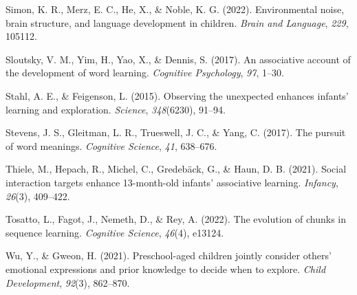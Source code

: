 \documentclass[10pt, letterpaper]{article}
\newenvironment{CSLReferences}%
  {}%
  {\par}
\begin{document}
\begin{CSLReferences}{1}{0}
\leavevmode{}%
Simon, K. R., Merz, E. C., He, X., \& Noble, K. G. (2022). Environmental
noise, brain structure, and language development in children.
\emph{Brain and Language}, \emph{229}, 105112.

\leavevmode{}%
Sloutsky, V. M., Yim, H., Yao, X., \& Dennis, S. (2017). An associative
account of the development of word learning. \emph{Cognitive
Psychology}, \emph{97}, 1--30.

\leavevmode{}%
Stahl, A. E., \& Feigenson, L. (2015). Observing the unexpected enhances
infants' learning and exploration. \emph{Science}, \emph{348}(6230),
91--94.

\leavevmode{}%
Stevens, J. S., Gleitman, L. R., Trueswell, J. C., \& Yang, C. (2017).
The pursuit of word meanings. \emph{Cognitive Science}, \emph{41},
638--676.

\leavevmode{}%
Thiele, M., Hepach, R., Michel, C., Gredebäck, G., \& Haun, D. B.
(2021). Social interaction targets enhance 13-month-old infants'
associative learning. \emph{Infancy}, \emph{26}(3), 409--422.

\leavevmode{}%
Tosatto, L., Fagot, J., Nemeth, D., \& Rey, A. (2022). The evolution of
chunks in sequence learning. \emph{Cognitive Science}, \emph{46}(4),
e13124.

\leavevmode{}%
Wu, Y., \& Gweon, H. (2021). Preschool-aged children jointly consider
others' emotional expressions and prior knowledge to decide when to
explore. \emph{Child Development}, \emph{92}(3), 862--870.

\end{CSLReferences}


\end{document}
